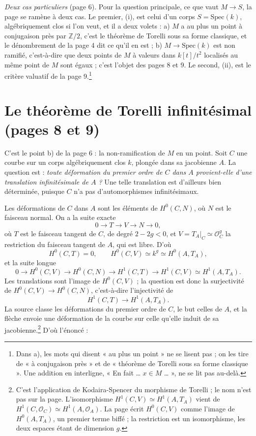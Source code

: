 \documentclass[11pt,a4paper]{article}
\begin{document}
\emph{Deux cas particuliers} (page 6). Pour la question principale, ce que
vaut $M \to S$, la page se ramène à deux cas. Le premier,
(i), est celui d'un corps $S = \mathrm{Spec}(k)$, algébriquement clos si l'on
veut, et il a deux volets : a) $M$ a au plus un point à conjugaison près par
$\mathbb{Z}/2$, c'est le théorème de Torelli sous sa forme classique, et le
dénombrement de la page 4 dit ce qu'il en est ; b) $M \to \mathrm{Spec}(k)$ est
non ramifié, c'est-à-dire que deux points de $M$ à valeurs dans
$k[t]/t^{2}$ localisés au même point de $M$ sont égaux ; c'est l'objet des
pages 8 et 9. Le second, (ii), est le critère valuatif de la page
9.\footnote{Dans a), les mots qui disent « au plus un point » ne se lisent
pas ; on les tire de « à conjugaison près » et de « théorème de Torelli sous sa
forme classique ». Une addition en interligne, « En fait … $x \in M$ … », ne
se lit pas au-delà.}

\section*{Le théorème de Torelli infinitésimal (pages 8 et 9)}

C'est le point b) de la page 6 : la non-ramification de $M$ en un point.
Soit $C$ une courbe sur un corps algébriquement clos $k$, plongée dans sa
jacobienne $A$. La question est : \emph{toute déformation du premier ordre de
$C$ dans $A$ provient-elle d'une translation infinitésimale de $A$ ?} Une telle
translation est d'ailleurs bien déterminée, puisque $C$ n'a pas
d'automorphismes infinitésimaux.

Les déformations de $C$ dans $A$ sont les éléments de $H^{0}(C, N)$, où $N$
est le faisceau normal. On a la suite exacte
\[
  0 \longrightarrow T \longrightarrow V \longrightarrow N \longrightarrow 0,
\]
où $T$ est le faisceau tangent de $C$, de degré $2 - 2g < 0$, et
$V = T_{A}|_{C} \simeq \mathcal{O}_{C}^{g}$ la restriction du faisceau tangent
de $A$, qui est libre. D'où
\[
  H^{0}(C, T) = 0, \qquad
  H^{0}(C, V) \simeq k^{g} \simeq H^{0}(A, T_{A}),
\]
et la suite longue
\[
  0 \to H^{0}(C, V) \to H^{0}(C, N) \to H^{1}(C, T)
    \to H^{1}(C, V) \simeq H^{1}(A, T_{A}).
\]
Les translations sont l'image de $H^{0}(C, V)$ ; la question est donc la
surjectivité de $H^{0}(C, V) \to H^{0}(C, N)$, c'est-à-dire l'injectivité de
\[
  H^{1}(C, T) \longrightarrow H^{1}(A, T_{A}).
\]
La source classe les déformations du premier ordre de $C$, le but celles de
$A$, et la flèche envoie une déformation de la courbe sur celle qu'elle induit
de sa jacobienne.\footnote{C'est l'application de Kodaira-Spencer du morphisme
de Torelli ; le nom n'est pas sur la page. L'isomorphisme
$H^{1}(C, V) \simeq H^{1}(A, T_{A})$ vient de
$H^{1}(C, \mathcal{O}_{C}) \simeq H^{1}(A, \mathcal{O}_{A})$. La page écrit
$H^{0}(C, V)$ comme l'image de $H^{0}(A, T_{A})$, un premier terme biffé ; la
restriction est un isomorphisme, les deux espaces étant de dimension $g$.} D'où l'énoncé :
\end{document}
